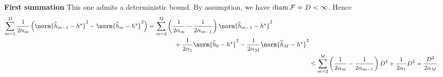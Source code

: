 \textbf{First summation }
This one admits a deterministic bound.
By assumption, we have $ \operatorname{diam} \mathcal{F} = D < \infty $.
Hence
\begin{align*}
    \begin{split}
        \sum_{ m=1 }^{ M } \frac{ 1 }{ 2 \alpha_{ m } } \left(
            \norm{ \hat{ h }_{ m-1 } - \hstar }^2
            -
            \norm{ \hat{ h }_{ m } - \hstar }^2
        \right)
        &= \sum_{ m=2 }^{ M } \left(
            \frac{ 1 }{ 2 \alpha_{ m } } - \frac{ 1 }{ 2 \alpha_{ m-1 } } 
        \right) \norm{ \hat{ h }_{ m-1 } - \hstar }^2 \\
        &\hspace{1.5cm}+ \frac{ 1 }{ 2 \alpha_{ 1 } } \norm{ \hat{ h }_{ 0 } - \hstar }^2 - \frac{ 1 }{ 2 \alpha_{ M } } \norm{ \hat{ h }_{ M } - \hstar }^2
    \end{split} \\
    &\leq 
    \sum_{ m=2 }^{ M } \left(
        \frac{ 1 }{ 2 \alpha_{ m } } - \frac{ 1 }{ 2 \alpha_{ m-1 } } 
    \right) D^2 + \frac{ 1 }{ 2 \alpha_{ 1 } } D^2 = \frac{ D^2 }{ 2 \alpha_{ M } }
.\end{align*}

